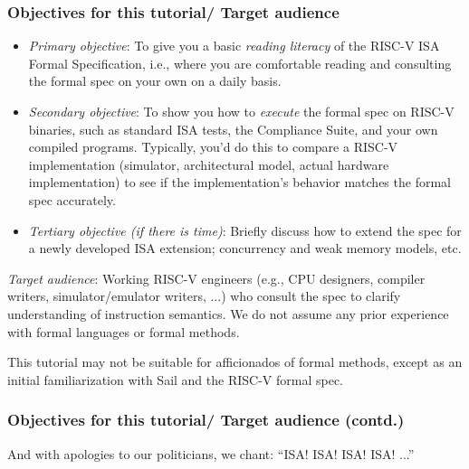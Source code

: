 \documentclass[aspectratio=169]{beamer}
\newcommand{\slidefont}{\scriptsize}
\begin{document}

\begin{frame}[fragile]
  \frametitle{Objectives for this tutorial/ Target audience}

  \slidefont

  \begin{itemize}
    \item \emph{Primary objective}: To give you a basic \emph{reading
      literacy} of the RISC-V ISA Formal Specification, i.e., where
      you are comfortable reading and consulting the formal spec on
      your own on a daily basis.

    \item \emph{Secondary objective}: To show you how to \emph{execute} the
      formal spec on RISC-V binaries, such as standard ISA tests, the
      Compliance Suite, and your own compiled programs.  Typically,
      you'd do this to compare a RISC-V implementation (simulator,
      architectural model, actual hardware implementation) to see if
      the implementation's behavior matches the formal spec
      accurately.

    \item \emph{Tertiary objective (if there is time)}: Briefly
      discuss how to extend the spec for a newly developed ISA
      extension; concurrency and weak memory models, etc.
 \end{itemize}

\vspace{1ex}

 \emph{Target audience}: Working RISC-V engineers (e.g., CPU
 designers, compiler writers, simulator/emulator writers, ...) who
 consult the spec to clarify understanding of instruction semantics.
 We do not assume any prior experience with formal languages or formal
 methods.

 \vspace{2ex}

 This tutorial may not be suitable for afficionados of formal methods,
 except as an initial familiarization with Sail and the RISC-V formal
 spec.

\end{frame}


\begin{frame}[fragile]
  \frametitle{Objectives for this tutorial/ Target audience (contd.)}

  \slidefont

  \begin{block}{}
    
  \end{block}

  \vspace{2ex}

  And with apologies to our politicians, we chant: ``ISA! ISA! ISA! ISA! ...''

\end{frame}
\end{document}
